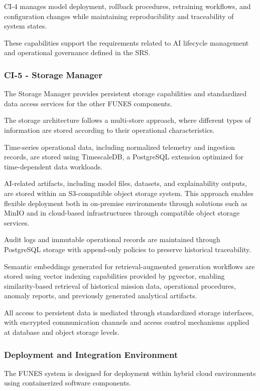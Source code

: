 CI-4 manages model deployment, rollback procedures, retraining workflows, and configuration changes while maintaining reproducibility and traceability of system states.

These capabilities support the requirements related to AI lifecycle management and operational governance defined in the SRS.

\subsubsection{CI-5 - Storage Manager}

The Storage Manager provides persistent storage capabilities and standardized data access services for the other FUNES components.

The storage architecture follows a multi-store approach, where different types of information are stored according to their operational characteristics.

Time-series operational data, including normalized telemetry and ingestion records, are stored using TimescaleDB, a PostgreSQL extension optimized for time-dependent data workloads.

AI-related artifacts, including model files, datasets, and explainability outputs, are stored within an S3-compatible object storage system. This approach enables flexible deployment both in on-premise environments through solutions such as MinIO and in cloud-based infrastructures through compatible object storage services.

Audit logs and immutable operational records are maintained through PostgreSQL storage with append-only policies to preserve historical traceability.

Semantic embeddings generated for retrieval-augmented generation workflows are stored using vector indexing capabilities provided by pgvector, enabling similarity-based retrieval of historical mission data, operational procedures, anomaly reports, and previously generated analytical artifacts.

All access to persistent data is mediated through standardized storage interfaces, with encrypted communication channels and access control mechanisms applied at database and object storage levels.

\subsubsection{Deployment and Integration Environment}

The FUNES system is designed for deployment within hybrid cloud environments using containerized software components.

